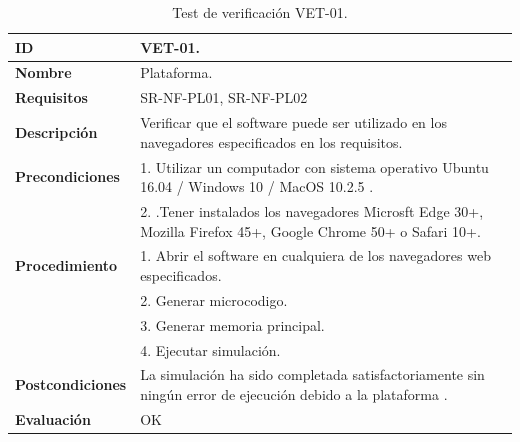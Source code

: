 \begin{center}
\begin{table}[htbp]
\centering
{}
\caption{Test de verificación VET-01.}
\begin{tabular}{@{}p{2.5cm} p{13cm}@{}} 
\toprule
\textbf{ID} 					& VET-01. \\
\midrule
\textbf{Nombre} 				& Plataforma. \\
\midrule
\textbf{Requisitos} 		& SR-NF-PL01, SR-NF-PL02\\
\midrule
\textbf{Descripción} 		& Verificar que el \gls{software} puede ser utilizado en los navegadores especificados en los requisitos. \\
\midrule
\textbf{Precondiciones}		& 1. Utilizar un computador con sistema operativo Ubuntu 16.04 / Windows 10 / MacOS 10.2.5 .\\
							& 2. .Tener instalados los navegadores Microsft Edge 30+, Mozilla Firefox 45+, Google Chrome 50+ o Safari 10+. \\
\midrule
\textbf{Procedimiento}			& 1. Abrir el \gls{software} en cualquiera de los navegadores web especificados. \\
							& 2. Generar \gls{microcodigo}.\\
							& 3. Generar memoria principal.\\
							& 4. Ejecutar simulación.\\
\midrule
\textbf{Postcondiciones} 		&  La simulación ha sido completada satisfactoriamente sin ningún error de ejecución debido a la plataforma .\\
\midrule
\textbf{Evaluación} 			& OK \\
\bottomrule
\end{tabular}
\label{tab:vet01}
\end{table}
\end{center}

